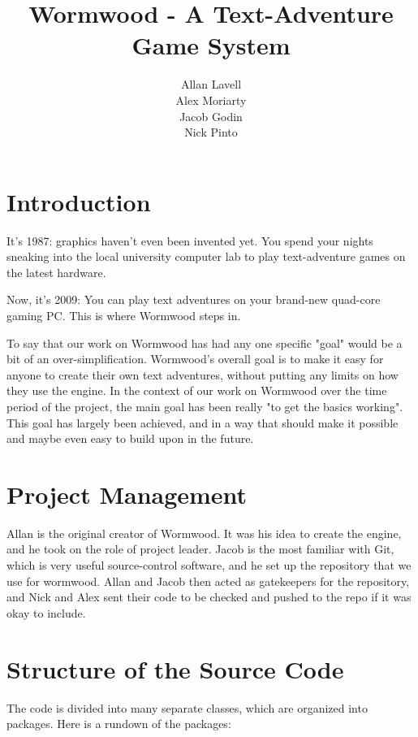 \documentclass[12pt]{report}
\title{Wormwood - A Text-Adventure Game System}
\author{Allan Lavell \\ Alex Moriarty \\ Jacob Godin \\ Nick Pinto}
\begin{document}
\maketitle
\setcounter{secnumdepth}{0}
\section{Introduction}
It's 1987: graphics haven't even been invented yet. You spend your nights sneaking into the local university computer lab to play text-adventure games on the latest hardware. 

Now, it's 2009: You can play text adventures on your brand-new quad-core gaming PC. This is where Wormwood steps in.

To say that our work on Wormwood has had any one specific "goal" would be
a bit of an over-simplification. Wormwood's overall goal is to make it easy 
for anyone to create their own text adventures, without putting any limits on
how they use the engine. In the context of our work on Wormwood over the time
period of the project, the main goal has been really "to get the basics working".
This goal has largely been achieved, and in a way that should make it possible
and maybe even easy to build upon in the future.

\section{Project Management}
Allan is the original creator of Wormwood. It was his idea to create the
engine, and he took on the role of project leader. Jacob is the most familiar
with Git, which is very useful source-control software, and he set up the
repository that we use for wormwood. Allan and Jacob then acted as gatekeepers
for the repository, and Nick and Alex sent their code to be checked and pushed
to the repo if it was okay to include. 

\section{Structure of the Source Code}
The code is divided into many separate 
classes, which are organized into packages. Here is a rundown of the packages:
\end{document}
